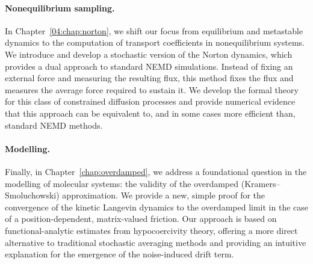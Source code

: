 \paragraph{Nonequilibrium sampling.}
In Chapter~\ref{04:chap:norton}, we shift our focus from equilibrium and metastable dynamics to the computation of transport coefficients in nonequilibrium systems. %
We introduce and develop a stochastic version of the Norton dynamics, which provides a dual approach to standard NEMD simulations. %
Instead of fixing an external force and measuring the resulting flux, this method fixes the flux and measures the average force required to sustain it. %
We develop the formal theory for this class of constrained diffusion processes and provide numerical evidence that this approach can be equivalent to, and in some cases more efficient than, standard NEMD methods. %

\paragraph{Modelling.}
Finally, in Chapter~\ref{chap:overdamped}, we address a foundational question in the modelling of molecular systems: the validity of the overdamped (Kramers--Smoluchowski) approximation. %
We provide a new, simple proof for the convergence of the kinetic Langevin dynamics to the overdamped limit in the case of a position-dependent, matrix-valued friction. %
Our approach is based on functional-analytic estimates from hypocoercivity theory, offering a more direct alternative to traditional stochastic averaging methods and providing an intuitive explanation for the emergence of the noise-induced drift term. %




